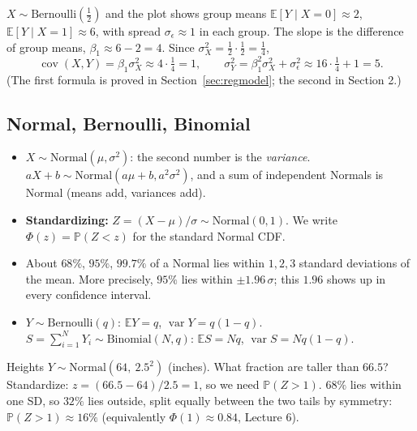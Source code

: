 \documentclass[11pt]{article}
\newcommand{\E}{\mathbb{E}}
\newcommand{\Var}{\operatorname{var}}
\newcommand{\Cov}{\operatorname{cov}}
\renewcommand{\P}{\mathbb{P}}
\newcommand{\given}{\mid}
\newcommand{\Bern}{\text{Bernoulli}}
\newcommand{\Bin}{\text{Binomial}}
\newcommand{\Norm}{\text{Normal}}
\begin{document}
\begin{examplebox}[title={Example (Lecture 7): reading covariance off a plot}]
$X\sim\Bern(\tfrac12)$ and the plot shows group means $\E[Y\given X{=}0]\approx2$, $\E[Y\given X{=}1]\approx6$, with spread $\sigma_\epsilon\approx1$
in each group. The slope is the difference of group means, $\beta_1\approx6-2=4$. Since $\sigma_X^2=\tfrac12\cdot\tfrac12=\tfrac14$,
\[
\Cov(X,Y)=\beta_1\sigma_X^2\approx4\cdot\tfrac14=1,\qquad
\sigma_Y^2=\beta_1^2\sigma_X^2+\sigma_\epsilon^2\approx16\cdot\tfrac14+1=5 .
\]
(The first formula is proved in Section~\ref{sec:regmodel}; the second in Section 2.)
\end{examplebox}

\subsection{Normal, Bernoulli, Binomial}
\begin{itemize}[leftmargin=*,itemsep=2pt]
\item $X\sim\Norm(\mu,\sigma^2)$: the second number is the \emph{variance}. $aX+b\sim\Norm(a\mu+b,a^2\sigma^2)$, and a sum of
independent Normals is Normal (means add, variances add).
\item \textbf{Standardizing:} $Z=(X-\mu)/\sigma\sim\Norm(0,1)$. We write $\Phi(z)=\P(Z<z)$ for the standard Normal CDF.
\item About $68\%$, $95\%$, $99.7\%$ of a Normal lies within $1,2,3$ standard deviations of the mean. More precisely, $95\%$ lies
within $\pm1.96\,\sigma$; this $1.96$ shows up in every confidence interval.
\item $Y\sim\Bern(q)$: $\E Y=q$, $\Var Y=q(1-q)$. $S=\sum_{i=1}^NY_i\sim\Bin(N,q)$: $\E S=Nq$, $\Var S=Nq(1-q)$.
\end{itemize}

\begin{examplebox}[title={Example: using the 68\% rule}]
Heights $Y\sim\Norm(64,\ 2.5^2)$ (inches). What fraction are taller than $66.5$? Standardize: $z=(66.5-64)/2.5=1$, so we need
$\P(Z>1)$. $68\%$ lies within one SD, so $32\%$ lies outside, split equally between the two tails by symmetry: $\P(Z>1)\approx16\%$
(equivalently $\Phi(1)\approx0.84$, Lecture 6).
\end{examplebox}
\end{document}
